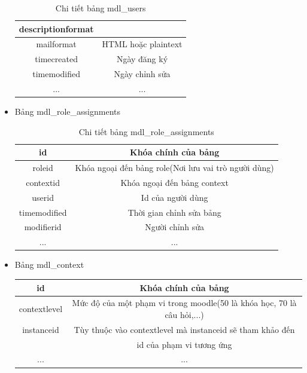 \begin{itemize}
\begin{center}
\begin{table}[!htp]
\begin{tabular}{|c|c|}
				\hline 
				descriptionformat &  \\ 
				\hline 
				mailformat & HTML hoặc plaintext \\
				\hline 
				timecreated & Ngày đăng ký \\ 
				\hline 
				timemodified & Ngày chỉnh sửa \\
				\hline 
				... & ... \\
				\hline
			\end{tabular}
			\caption{Chi tiết bảng mdl\_users}
			\label{bang4}
		\end{table}
	\end{center}
	\newpage
	\item Bảng mdl\_role\_assignments
	\begin{center}
		\begin{table}[!htp]
			\centering
			\begin{tabular}{|c|c|}
				\hline 
				id & Khóa chính của bảng \\ 
				\hline 
				roleid & Khóa ngoại đến bảng role(Nơi lưu vai trò người dùng) \\ 
				\hline 
				contextid & Khóa ngoại đến bảng context \\ 
				\hline 
				userid & Id của người dùng \\ 
				\hline 
				timemodified & Thời gian chỉnh sửa bảng \\ 
				\hline 
				modifierid & Người chỉnh sửa \\ 
				\hline 
				... & ... \\
				\hline
			\end{tabular} 
			\caption{Chi tiết bảng mdl\_role\_assignments}
			\label{bang5}
		\end{table}
	\end{center}
	\item Bảng mdl\_context
	\begin{center}
		\begin{table}[!htp]
			\centering
			\begin{tabular}{|c|c|}
				\hline 
				id & Khóa chính của bảng \\ 
				\hline 
				contextlevel & Mức độ của một phạm vi trong moodle(50 là khóa học, 70 là câu hỏi,...) \\ 
				\hline 
				instanceid & Tùy thuộc vào contextlevel mà instanceid sẽ tham khảo đến \\ & id của phạm vi tương ứng \\ 
				\hline 
				... & ... \\
				\hline

\end{tabular}
\end{table}
\end{center}
\end{itemize}
